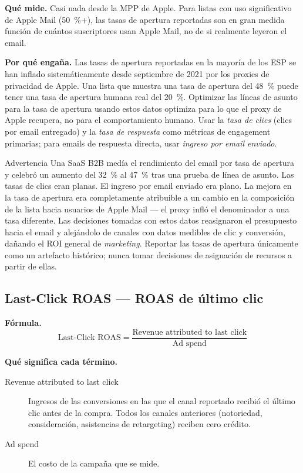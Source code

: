 \textbf{Qué mide.} Casi nada desde la MPP de Apple. Para listas con uso significativo de
Apple Mail (\qty{50}{\percent}+), las tasas de apertura reportadas son en gran medida función
de cuántos suscriptores usan Apple Mail, no de si realmente leyeron el email.

\textbf{Por qué engaña.} Las tasas de apertura reportadas en la mayoría de los ESP se han
inflado sistemáticamente desde septiembre de 2021 por los proxies de privacidad de Apple.
Una lista que muestra una tasa de apertura del \qty{48}{\percent} puede tener una tasa de
apertura humana real del \qty{20}{\percent}. Optimizar las líneas de asunto para la tasa de
apertura usando estos datos optimiza para lo que el proxy de Apple recupera, no para el
comportamiento humano. Usar la \emph{tasa de clics} (clics por email entregado) y la
\emph{tasa de respuesta} como métricas de engagement primarias; para emails de respuesta
directa, usar \emph{ingreso por email enviado}.

\begin{admonition}{Advertencia}
Una SaaS B2B medía el rendimiento del email por tasa de apertura y celebró un aumento del
\qty{32}{\percent} al \qty{47}{\percent} tras una prueba de línea de asunto. Las tasas de
clics eran planas. El ingreso por email enviado era plano. La mejora en la tasa de apertura
era completamente atribuible a un cambio en la composición de la lista hacia usuarios de
Apple Mail --- el proxy infló el denominador a una tasa diferente. Las decisiones tomadas
con estos datos reasignaron el presupuesto hacia el email y alejándolo de canales con datos
medibles de clic y conversión, dañando el ROI general de \emph{marketing}. Reportar las
tasas de apertura únicamente como un artefacto histórico; nunca tomar decisiones de
asignación de recursos a partir de ellas.
\end{admonition}


\subsection{Last-Click ROAS --- ROAS de último clic}

\textbf{Fórmula.}
\[
  \text{Last-Click ROAS} = \frac{\text{Revenue attributed to last click}}{\text{Ad spend}}
\]

\textbf{Qué significa cada término.}
\begin{description}
  \item[Revenue attributed to last click] Ingresos de las conversiones en las que el canal
    reportado recibió el último clic antes de la compra. Todos los canales anteriores
    (notoriedad, consideración, asistencias de retargeting) reciben cero crédito.
  \item[Ad spend] El costo de la campaña que se mide.
\end{description}

